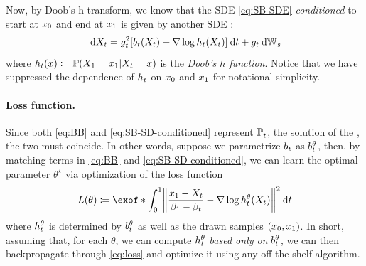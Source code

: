 Now, by Doob's h-transform, we know that the \acrshort{SDE} \eqref{eq:SB-SDE} \emph{conditioned} to start at $x_0$ and end at $x_1$ is given by another \acrshort{SDE}  \citep{doob1984classical,rogers2000diffusions}:
\begin{equation}
\label{eq:SB-SD-conditioned}
\dd X_t = \volatsq[\ctime]\bracks*{\fdrift(X_t) + \nabla \log \doob(X_t) }\dt +\volat \dWiener
\end{equation}
where $h_t(x) \coloneqq \operatorname{\mathbb{P}}(X_1 = x_1\vert X_t = x)$ is the \emph{Doob's $h$ function}. Notice that we have suppressed the dependence of $h_t$ on $x_0$ and $x_1$ for notational simplicity. %

\paragraph{Loss function.}

Since both \eqref{eq:BB} and \eqref{eq:SB-SD-conditioned} represent $\mathbb{P}^{}_{ t }$, the solution of the , the two  must coincide. 
In other words, suppose we parametrize $b_t$ as $b_t^\theta$, then, by matching terms in \eqref{eq:BB} and \eqref{eq:SB-SD-conditioned}, we can learn the optimal parameter $\theta^\star$ via optimization of the loss function
\begin{equation}
\label{eq:loss}
\Loss(\theta) \defeq \exof*{\int_0^1 \norm*{ \frac{\x_1-X_t}{\cvolat[\horizon]-\cvolat[\ctime]}-\nabla \log \doob^\theta(X_t)}^2 \dt  }
\end{equation}where $h_t^\theta$ is determined by $b_t^\theta$ as well as the drawn samples $(x_0,x_1)$. In short, assuming that, for each $\theta$, we can compute $h_t^\theta$ \emph{based only on} $b_t^\theta$, we can then backpropagate through \eqref{eq:loss} and optimize it using any off-the-shelf algorithm.

